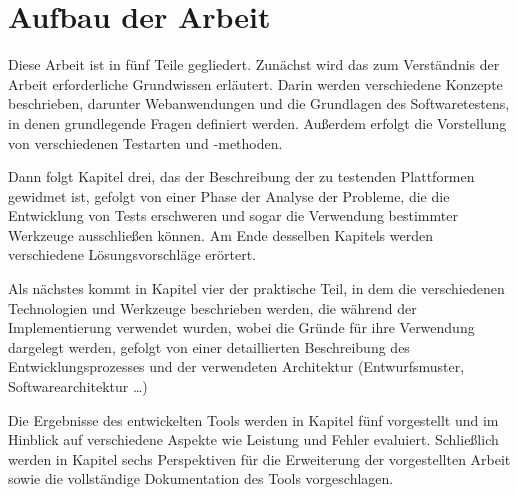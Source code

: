 \section{Aufbau der Arbeit}


Diese Arbeit ist in fünf Teile gegliedert. Zunächst wird das zum Verständnis der
Arbeit erforderliche Grundwissen erläutert. Darin werden verschiedene Konzepte
beschrieben, darunter Webanwendungen und die Grundlagen des Softwaretestens,
in denen grundlegende Fragen definiert werden. Außerdem erfolgt die Vorstellung
von verschiedenen Testarten und -methoden.


Dann folgt Kapitel drei, das der Beschreibung der zu testenden Plattformen
gewidmet ist, gefolgt von einer Phase der Analyse der Probleme, die die
Entwicklung von Tests erschweren und sogar die Verwendung bestimmter Werkzeuge
ausschließen können.  Am Ende desselben Kapitels werden verschiedene
Lösungsvorschläge erörtert.


Als nächstes kommt in Kapitel vier  der praktische Teil, in dem die verschiedenen
Technologien und Werkzeuge beschrieben werden, die während der Implementierung
verwendet wurden, wobei die Gründe für ihre Verwendung dargelegt werden,
gefolgt von einer detaillierten Beschreibung des Entwicklungsprozesses und
der verwendeten Architektur (Entwurfsmuster, Softwarearchitektur \ldots)


Die Ergebnisse des entwickelten Tools werden in Kapitel fünf vorgestellt und im
Hinblick auf verschiedene Aspekte wie Leistung und Fehler evaluiert. Schließlich
werden in Kapitel sechs Perspektiven für die Erweiterung der vorgestellten
Arbeit sowie die vollständige Dokumentation des Tools vorgeschlagen.

